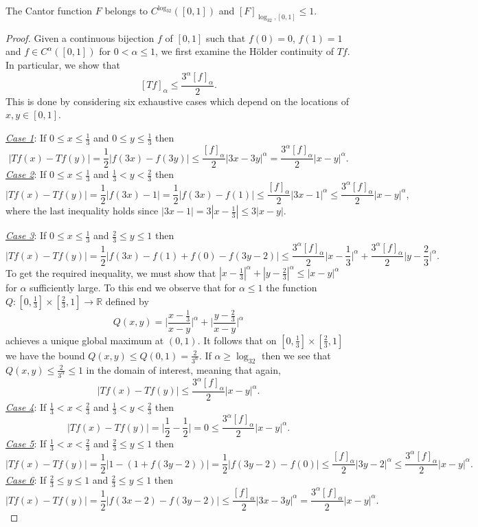 \documentclass[oneside,hidelinks,indentfirst,10pt]{book}
\begin{document}
\begin{clm}
The Cantor function \(F\) belongs to \(C^{\log_32}([0,1])\) and \([F]_{\log_32,[0,1]}\leq1\).
\end{clm}

\begin{proof} Given a continuous bijection \(f\) of \([0,1]\) such that \(f(0)=0\), \(f(1)=1\) and \(f\in C^{\alpha}([0,1])\) for \(0<\alpha\leq 1\), we first examine the H\"older continuity of \(Tf\). In particular, we show that
\[
    [Tf]_\alpha\leq \frac{3^\alpha[f]_\alpha}{2}.
\]
This is done by considering six exhaustive cases which depend on the locations of \(x,y\in[0,1]\).

\noindent\underline{\textit{Case 1}}: If \(0\leq x\leq \frac{1}{3}\) and \(0\leq y\leq \frac{1}{3}\) then
\[
    |Tf(x)-Tf(y)|=\frac{1}{2}|f(3x)-f(3y)|\leq \frac{[f]_\alpha}{2}|3x-3y|^\alpha=\frac{3^\alpha[f]_\alpha}{2}|x-y|^\alpha.
\]
\noindent\underline{\textit{Case 2}}: If \(0\leq x\leq \frac{1}{3}\) and \(\frac{1}{3}< y<\frac{2}{3}\) then
\[
    |Tf(x)-Tf(y)|=\frac{1}{2}|f(3x)-1|=\frac{1}{2}|f(3x)-f(1)|\leq \frac{[f]_\alpha}{2}|3x-1|^\alpha\leq \frac{3^\alpha[f]_\alpha}{2}|x-y|^\alpha,
\]
where the last inequality holds since \(|3x-1|=3|x-\frac{1}{3}|\leq 3|x-y| \).


\noindent\underline{\textit{Case 3}}: If \(0\leq x\leq \frac{1}{3}\) and \(\frac{2}{3}\leq y\leq 1\) then 
\[
    |Tf(x)-Tf(y)|=\frac{1}{2}|f(3x)-f(1)+f(0)-f(3y-2)|\leq \frac{3^\alpha[f]_\alpha}{2}\bigg|x-\frac{1}{3}\bigg|^\alpha+\frac{3^\alpha[f]_\alpha}{2}\bigg|y-\frac{2}{3}\bigg|^\alpha.
\]
To get the required inequality, we must show that \(|x-\frac{1}{3}|^\alpha+|y-\frac{2}{3}|^\alpha\leq |x-y|^\alpha\) for \(\alpha\) sufficiently large. To this end we observe that for \(\alpha\leq 1\) the function \(Q:[0,\frac{1}{3}]\times[\frac{2}{3},1]\rightarrow\mathbb{R}\) defined by
\[
    Q(x,y)=\bigg|\frac{x-\frac{1}{3}}{x-y}\bigg|^\alpha+\bigg|\frac{y-\frac{2}{3}}{x-y}\bigg|^\alpha
\]
achieves a unique global maximum at \((0,1)\). It follows that on \([0,\frac{1}{3}]\times[\frac{2}{3},1]\) we have the bound \( Q(x,y)\leq Q(0,1)=\frac{2}{3^\alpha}\). If \(\alpha\geq\log_32\) then we see that \(Q(x,y)\leq \frac{2}{3^\alpha}\leq 1\) in the domain of interest, meaning that again,
\[
    |Tf(x)-Tf(y)|\leq \frac{3^\alpha[f]_\alpha}{2}|x-y|^\alpha.
\]
\underline{\textit{Case 4}}: If \(\frac{1}{3}<x<\frac{2}{3}\) and \(\frac{1}{3}<y<\frac{2}{3}\) then
\[
    |Tf(x)-Tf(y)|=\bigg|\frac{1}{2}-\frac{1}{2}\bigg|=0\leq \frac{3^\alpha[f]_\alpha}{2}|x-y|^\alpha.
\]
\noindent\underline{\textit{Case 5}}: If \(\frac{1}{3}<x<\frac{2}{3}\) and \(\frac{2}{3}\leq y\leq 1\) then
\[
    |Tf(x)-Tf(y)|=\frac{1}{2}|1-(1+f(3y-2))|=\frac{1}{2}|f(3y-2)-f(0)|\leq \frac{[f]_\alpha}{2}|3y-2|^\alpha\leq\frac{3^\alpha[f]_\alpha}{2}|x-y|^\alpha.
\]
\noindent\underline{\textit{Case 6}}: If \(\frac{2}{3}\leq y\leq 1\) and \(\frac{2}{3}\leq y\leq 1\) then
\[
    |Tf(x)-Tf(y)|=\frac{1}{2}|f(3x-2)-f(3y-2)|\leq \frac{[f]_\alpha}{2}|3x-3y|^\alpha=\frac{3^\alpha[f]_\alpha}{2}|x-y|^\alpha.
\]



\end{proof}
\end{document}
